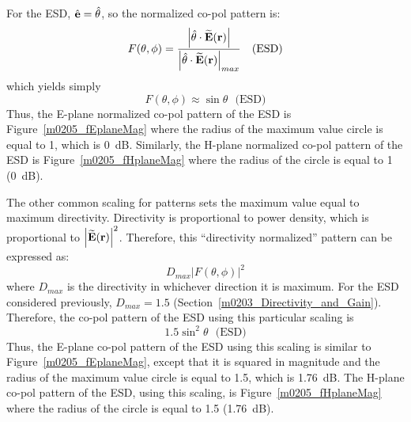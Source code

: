 For the ESD,  $\hat{\bf e}=\hat{\bf \theta}$, so the normalized co-pol pattern is:
%
\begin{equation}
F(\theta,\phi) = \frac{\left|\hat{\bf \theta}\cdot\widetilde{\bf E}({\bf r})\right|}{\left|\hat{\bf \theta}\cdot\widetilde{\bf E}({\bf r})\right|_{max}} ~~~ \mbox{(ESD)}
\end{equation}
%
which yields simply
%
\begin{equation}
F(\theta,\phi) \approx \sin\theta ~~~ \mbox{(ESD)}
\end{equation}
%
Thus, the E-plane normalized co-pol pattern of the ESD is Figure~\ref{m0205_fEplaneMag} where the radius of the maximum value circle is equal to 1, which is 0~dB.
Similarly, the H-plane normalized co-pol pattern of the ESD is Figure~\ref{m0205_fHplaneMag} where the radius of the circle is equal to 1 (0~dB).

The other common scaling for patterns sets the maximum value equal to maximum directivity.
Directivity is proportional to power density, which is proportional to $\left|\widetilde{\bf E}({\bf r})\right|^2$.
Therefore, this ``directivity normalized'' pattern can be expressed as:
%
\begin{equation}
D_{max}\left|F(\theta,\phi)\right|^2 
\end{equation}
%
where $D_{max}$ is the directivity in whichever direction it is maximum.
For the ESD considered previously, $D_{max}=1.5$ (Section~\ref{m0203_Directivity_and_Gain}).
Therefore, the co-pol pattern of the ESD using this particular scaling is
%
\begin{equation}
1.5 \sin^2\theta ~~~ \mbox{(ESD)}
\end{equation}
%
Thus, the E-plane co-pol pattern of the ESD using this scaling is similar to Figure~\ref{m0205_fEplaneMag}, except that it is squared in magnitude and the radius of the maximum value circle is equal to 1.5, which is 1.76~dB.
The H-plane co-pol pattern of the ESD, using this scaling, is Figure~\ref{m0205_fHplaneMag} where the radius of the circle is equal to 1.5 (1.76~dB).

